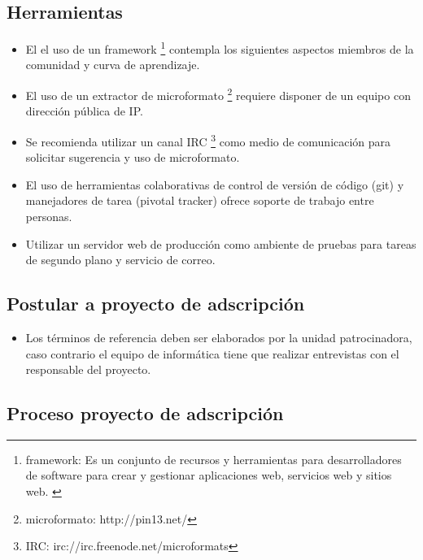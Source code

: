 \subsection{Herramientas}

\begin{itemize}

\item El el uso de un framework \footnote{framework: Es un conjunto de
recursos y herramientas para desarrolladores de software para crear y
gestionar aplicaciones web, servicios web y sitios web. \cite{framework}}
contempla los siguientes aspectos miembros de la comunidad y curva de
aprendizaje.

\item El uso de un extractor de microformato \footnote{microformato: http://pin13.net/}
requiere disponer de un equipo con dirección pública de IP.

\item Se recomienda utilizar un canal IRC 
\footnote{IRC: irc://irc.freenode.net/microformats} como medio de comunicación
para solicitar sugerencia y uso de microformato.

\item El uso de herramientas colaborativas de control de versión de código
(git) y manejadores de tarea (pivotal tracker) ofrece soporte de trabajo
entre personas.

\item Utilizar un servidor web de producción como ambiente de pruebas para tareas
de segundo plano y servicio de correo.

\end{itemize}

\subsection{Postular a proyecto de adscripción}

\begin{itemize}

\item Los términos de referencia deben ser elaborados por la unidad
patrocinadora, caso contrario el equipo de informática tiene que realizar
entrevistas con el responsable del proyecto.

\end{itemize}

\subsection{Proceso proyecto de adscripción}


